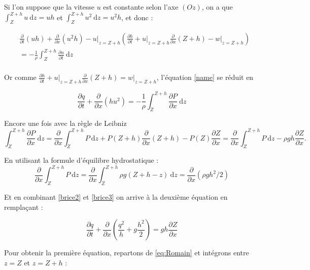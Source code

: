 \documentclass[
11pt, %
francais, %
singlespacing, %
headsepline, %
]{MastersDoctoralThesis} %
\begin{document}
Si l'on suppose que la vitesse $u$ est constante selon l'axe $(Oz)$, on a que $\int_{Z}^{Z+h}u ~\mathrm dz = uh$ et $\int_{Z}^{Z+h}u^{2} ~\mathrm dz = u^{2}h$, et donc :

\begin{equation}
\begin{split}
& \frac{\partial}{\partial t}(uh)+ \frac{\partial}{\partial x}(u^{2}h)-u\vert_{z=Z+h}(\frac{\partial h}{\partial t}+u\vert_{z=Z+h}\frac{\partial}{\partial x}(Z+h)-w\vert_{z=Z+h}) \\
& =-\frac{1}{\rho}\int_{Z}^{Z+h}\frac{\partial u}{\partial t} ~\mathrm dz \\ \label{name}
\end{split}
\end{equation}

Or comme $\frac{\partial h}{\partial t}+u\vert_{z=Z+h}\frac{\partial}{\partial x}(Z+h)=w\vert_{z=Z+h}$, l'équation \ref{name} se réduit en

\begin{equation}
 \frac{\partial q}{\partial t}+ \frac{\partial}{\partial x}(hu^{2})=-\frac{1}{\rho}\int_{Z}^{Z+h}\frac{\partial P}{\partial x} ~\mathrm dz \label{brice2}
 \end{equation}

Encore une fois avec la règle de Leibniz 
$$\int_{Z}^{Z+h}\frac{\partial P}{\partial x} ~\mathrm dz =\frac{\partial }{\partial x}\int_{Z}^{Z+h}P ~\mathrm dz + P(Z+h)\frac{\partial}{\partial x}(Z+h)-P(Z)\frac{\partial Z}{\partial x} = \frac{\partial }{\partial x}\int_{Z}^{Z+h}P ~\mathrm dz-\rho g h\frac{\partial Z}{\partial x}.$$ 

En utilisant la formule d'équilibre hydrostatique : 
\begin{equation}
\frac{\partial}{\partial x}\int_{Z}^{Z+h}P ~\mathrm dz=\frac{\partial}{\partial x} \int_{Z}^{Z+h}\rho g(Z+h-z) ~\mathrm dz = \frac{\partial}{\partial x}(\rho g h^{2}/2) \label{brice3}
\end{equation}

Et en combinant \ref{brice2} et \ref{brice3} on arrive à la deuxième équation en rempla\c cant :

\begin{equation}
\frac{\partial q}{\partial t}+\frac{\partial}{\partial x}(\frac{q^{2}}{h}+g\frac{h^{2}}{2})=g h\frac{\partial Z}{\partial x} \label{EqSaintVenant2}
\end{equation}


Pour obtenir la première équation, repartons de \ref{eq:Romain} et intégrons entre $z=Z$ et $z=Z+h$ :
\end{document}
